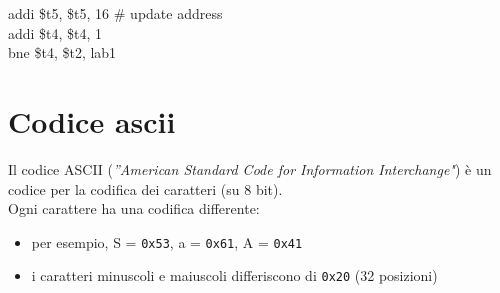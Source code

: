 \documentclass[../main.tex]{subfiles}
\begin{document}
{    \hspace*{4mm} \hspace*{0cm} \hspace*{0cm} \hspace*{0cm} \hspace*{0cm} addi \$t5, \$t5, 16 \hspace*{0cm} \hspace*{0cm} \# update address \\
    \hspace*{4mm} \hspace*{0cm} \hspace*{0cm} \hspace*{0cm} \hspace*{0cm} addi \$t4, \$t4, 1 \\
    \hspace*{4mm} \hspace*{0cm} \hspace*{0cm} \hspace*{0cm} \hspace*{0cm} bne \$t4, \$t2, lab1 \\
}

\newpage

\section{Codice ascii}
Il codice ASCII (\textit{''American Standard Code for Information
Interchange"}) è un codice per la codifica dei caratteri (su 8 bit).
\\[2mm]
Ogni carattere ha una codifica differente:
\begin{itemize}
    \item per esempio, S = \texttt{0x53}, a = \texttt{0x61}, A = \texttt{0x41}
    \item i caratteri minuscoli e maiuscoli differiscono di \texttt{0x20} (32 posizioni)
\end{itemize}
\end{document}
